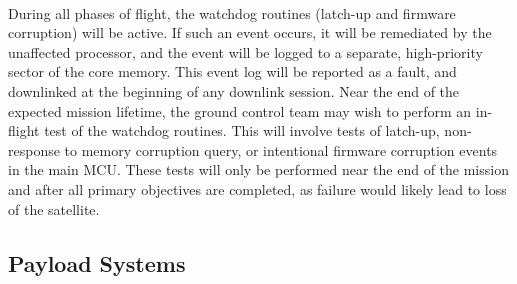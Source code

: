 \documentclass[nocover]            %
{CSLI}                       %
\begin{document}
\\During all phases of flight, the watchdog routines (latch-up and firmware corruption) will be active. If such an event occurs, it will be remediated by the unaffected processor, and the event will be logged to a separate, high-priority sector of the core memory. This event log will be reported as a fault, and downlinked at the beginning of any downlink session. Near the end of the expected mission lifetime, the ground control team may wish to perform an in-flight test of the watchdog routines. This will involve tests of latch-up, non-response to memory corruption query, or intentional firmware corruption events in the main MCU. These tests will only be performed near the end of the mission and after all primary objectives are completed, as failure would likely lead to loss of the satellite. 
\subsection{Payload Systems}
\end{document}
